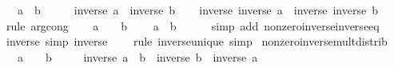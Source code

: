 \begin{isabellebody}
\ \ \ {\isachardoublequoteopen}a\ {\isacharequal}{\kern0pt}\ b{\isachardoublequoteclose}\isanewline
%
\isadelimproof
%
\endisadelimproof
%
\isatagproof
{}\isamarkupfalse%
\ {\isacharminus}{\kern0pt}\isanewline
\ \ \isamarkupfalse%
\ {\isacartoucheopen}inverse\ a\ {\isacharequal}{\kern0pt}\ inverse\ b{\isacartoucheclose}\isanewline
\ \ \isamarkupfalse%
\ {\isachardoublequoteopen}inverse\ {\isacharparenleft}{\kern0pt}inverse\ a{\isacharparenright}{\kern0pt}\ {\isacharequal}{\kern0pt}\ inverse\ {\isacharparenleft}{\kern0pt}inverse\ b{\isacharparenright}{\kern0pt}{\isachardoublequoteclose}\ \isamarkupfalse%
\ {\isacharparenleft}{\kern0pt}rule\ arg{\isacharunderscore}{\kern0pt}cong{\isacharparenright}{\kern0pt}\isanewline
\ \ \isamarkupfalse%
\ {\isacartoucheopen}a\ {\isasymnoteq}\ {}{\isacartoucheclose}\ \ {\isacartoucheopen}b\ {\isasymnoteq}\ {}{\isacartoucheclose}\ \isamarkupfalse%
\ {\isachardoublequoteopen}a\ {\isacharequal}{\kern0pt}\ b{\isachardoublequoteclose}\isanewline
\ \ \ \ \isamarkupfalse%
\ {\isacharparenleft}{\kern0pt}simp\ add{\isacharcolon}{\kern0pt}\ nonzero{\isacharunderscore}{\kern0pt}inverse{\isacharunderscore}{\kern0pt}inverse{\isacharunderscore}{\kern0pt}eq{\isacharparenright}{\kern0pt}\isanewline
{}\isamarkupfalse%
%
\endisatagproof
{\isafoldproof}%
%
\isadelimproof
\isanewline
%
\endisadelimproof
\isanewline
{}\isamarkupfalse%
\ inverse{\isacharunderscore}{\kern0pt}{}\ {\isacharbrackleft}{\kern0pt}simp{\isacharbrackright}{\kern0pt}{\isacharcolon}{\kern0pt}\ {\isachardoublequoteopen}inverse\ {}\ {\isacharequal}{\kern0pt}\ {}{\isachardoublequoteclose}\isanewline
%
\isadelimproof
%
\endisadelimproof
%
\isatagproof
{}\isamarkupfalse%
\ {\isacharparenleft}{\kern0pt}rule\ inverse{\isacharunderscore}{\kern0pt}unique{\isacharparenright}{\kern0pt}\ simp%
\endisatagproof
{\isafoldproof}%
%
\isadelimproof
\isanewline
%
\endisadelimproof
\isanewline
{}\isamarkupfalse%
\ nonzero{\isacharunderscore}{\kern0pt}inverse{\isacharunderscore}{\kern0pt}mult{\isacharunderscore}{\kern0pt}distrib{\isacharcolon}{\kern0pt}\isanewline
\ \ \ {\isachardoublequoteopen}a\ {\isasymnoteq}\ {}{\isachardoublequoteclose}\ \ {\isachardoublequoteopen}b\ {\isasymnoteq}\ {}{\isachardoublequoteclose}\isanewline
\ \ \ {\isachardoublequoteopen}inverse\ {\isacharparenleft}{\kern0pt}a\ {\isacharasterisk}{\kern0pt}\ b{\isacharparenright}{\kern0pt}\ {\isacharequal}{\kern0pt}\ inverse\ b\ {\isacharasterisk}{\kern0pt}\ inverse\ a{\isachardoublequoteclose}\isanewline

\end{isabellebody}
